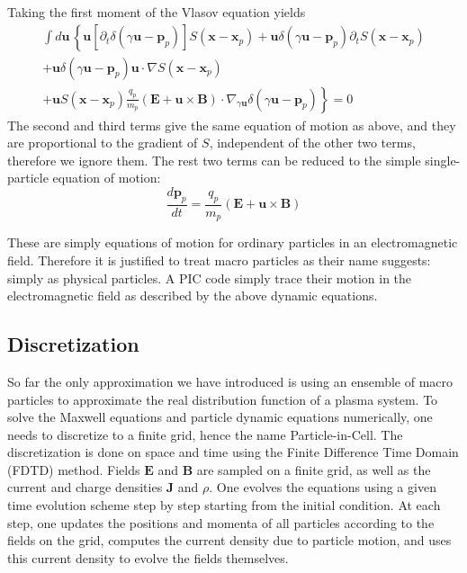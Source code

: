 Taking the first moment of the Vlasov equation yields
\begin{equation}
\begin{split}
    \int d\mathbf{u}\,\left\{ \mathbf{u}\left[ \partial_t \delta(\gamma \mathbf{u} - \mathbf{p}_p) \right]S(\mathbf{x} - \mathbf{x}_p) + \mathbf{u}\delta(\gamma \mathbf{u} - \mathbf{p}_p)\partial_tS(\mathbf{x} - \mathbf{x}_p) \right. \\
    + \mathbf{u}\delta(\gamma \mathbf{u} - \mathbf{p}_p) \mathbf{u}\cdot\nabla S(\mathbf{x} - \mathbf{x}_p) \\
    \left. + \mathbf{u}S(\mathbf{x} - \mathbf{x}_p)\frac{q_p}{m_p}(\mathbf{E} + \mathbf{u}\times \mathbf{B})\cdot \nabla_{\gamma \mathbf{u}}\delta(\gamma \mathbf{u} - \mathbf{p}_p) \right\} = 0
\end{split}
\end{equation}
The second and third terms give the same equation of motion as above, and they
are proportional to the gradient of $S$, independent of the other two terms,
therefore we ignore them. The rest two terms can be reduced to the simple
single-particle equation of motion:
\begin{equation}
  \label{eq:eom-momentum}
\frac{d\mathbf{p}_p}{dt} = \frac{q_p}{m_p}(\mathbf{E} + \mathbf{u}\times \mathbf{B})
\end{equation}

These are simply equations of motion for ordinary particles in an
electromagnetic field. Therefore it is justified to treat macro particles as
their name suggests: simply as physical particles. A PIC code simply trace their
motion in the electromagnetic field as described by the above dynamic equations.


\subsection{Discretization}
\label{sec:discretization}

So far the only approximation we have introduced is using an ensemble of macro
particles to approximate the real distribution function of a plasma system. To
solve the Maxwell equations and particle dynamic equations numerically, one
needs to discretize to a finite grid, hence the name Particle-in-Cell. The
discretization is done on space and time using the Finite Difference Time Domain
(FDTD) method. %
Fields $\mathbf{E}$ and $\mathbf{B}$ are sampled on a finite
grid, as well as the current and charge densities $\mathbf{J}$ and $\rho$. One
evolves the equations using a given time evolution scheme step by step starting
from the initial condition. At each step, one updates the positions and momenta
of all particles according to the fields on the grid, computes the current
density due to particle motion, and uses this current density to evolve the
fields themselves.

